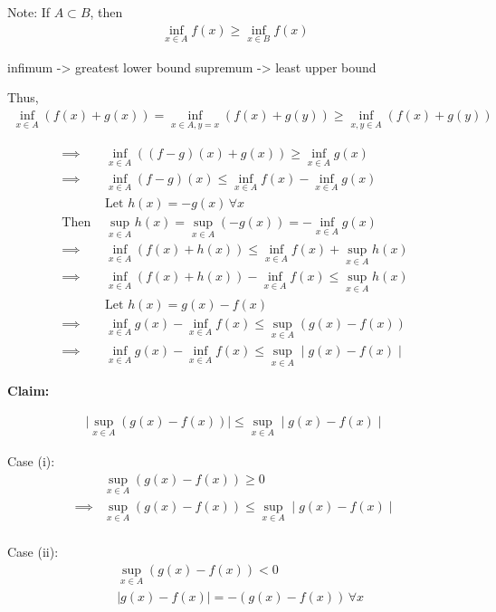 \documentclass[11pt]{article}
\begin{document}
Note: If \(A \subset B\), then
\begin{align*}
  \inf_{x \in A} f(x) \geq \inf_{x \in B} f(x)
\end{align*}

infimum -> greatest lower bound
supremum -> least upper bound

Thus,
\begin{align*}
\inf_{x\in A} (f(x) + g(x)) = \inf_{x \in A, y = x} (f(x) + g(y)) \geq \inf_{x,y \in A} (f(x) + g(y))
\end{align*}

\begin{align*}
 \implies &\inf_{x \in A} ( (f-g)(x) + g(x)) \geq \inf_{x \in A} g(x) \\
 \implies &\inf_{x \in A} (f-g)(x) \leq \inf_{x \in A} f(x) - \inf_{x \in A} g(x) \\
          &\text{Let $h(x) = -g(x)\, \forall x$} \\
 \text{Then } &\sup_{x \in A} h(x) = \sup_{x \in A} (-g(x)) = - \inf_{x \in A} g(x) \\
 \implies &\inf_{x \in A} (f(x) + h(x)) \leq \inf_{x \in A} f(x) + \sup_{x \in A} h(x) \\
 \implies &\inf_{x \in A} (f(x) + h(x)) - \inf_{x \in A} f(x)  \leq \sup_{x \in A} h(x) \\
          &\text{Let $h(x) = g(x) - f(x)$} \\
 \implies &\inf_{x \in A} g(x) - \inf_{x \in A} f(x) \leq \sup_{x \in A} (g(x) - f(x)) \\
 \implies &\inf_{x \in A} g(x) - \inf_{x \in A} f(x) \leq \sup_{x \in A} \mid g(x) - f(x) \mid
 \end{align*}

\textbf{Claim:}

\begin{align*}
 \mid \sup_{x \in A} (g(x) - f(x)) \mid \leq \sup_{x \in A} \mid g(x) - f(x) \mid
\end{align*}

Case (i):
\begin{align*}
&\sup_{x \in A} (g(x) - f(x)) \geq 0 \\
\implies &\sup_{x \in A} (g(x) - f(x)) \leq \sup_{x \in A} \mid g(x) - f(x) \mid \\
\end{align*}

Case (ii):
\begin{align*}
&\sup_{x \in A} (g(x) - f(x)) < 0 \\
&\mid g(x) - f(x) \mid = - (g(x) - f(x)) \, \forall x
\end{align*}
\end{document}
